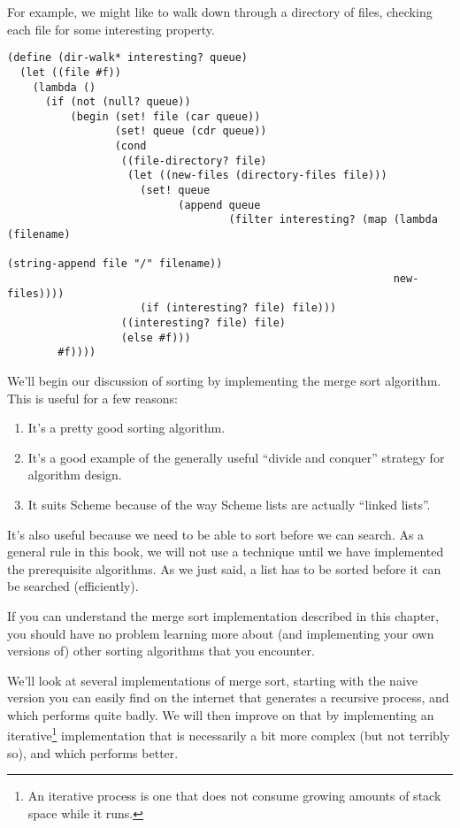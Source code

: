 \documentclass[12pt,openright,draft]{book}
\begin{document}
For example, we might like to walk down through a directory of files,
checking each file for some interesting property.

\begin{verbatim}
(define (dir-walk* interesting? queue)
  (let ((file #f))
    (lambda ()
      (if (not (null? queue))
          (begin (set! file (car queue))
                 (set! queue (cdr queue))
                 (cond
                  ((file-directory? file)
                   (let ((new-files (directory-files file)))
                     (set! queue
                           (append queue
                                   (filter interesting? (map (lambda (filename)
                                                               (string-append file "/" filename))
                                                             new-files))))
                     (if (interesting? file) file)))
                  ((interesting? file) file)
                  (else #f)))
        #f))))
\end{verbatim}

We'll begin our discussion of sorting by implementing the merge sort
algorithm.  This is useful for a few reasons:

\begin{enumerate}
\item It's a pretty good sorting algorithm.
\item It's a good example of the generally useful ``divide and
  conquer'' strategy for algorithm design.
\item It suits Scheme because of the way Scheme lists are
  actually ``linked lists''.
\end{enumerate}

It's also useful because we need to be able to sort before we can
search.  As a general rule in this book, we will not use a technique
until we have implemented the prerequisite algorithms.  As we just
said, a list has to be sorted before it can be searched (efficiently).

If you can understand the merge sort implementation described in this
chapter, you should have no problem learning more about (and
implementing your own versions of) other sorting algorithms that you
encounter.

We'll look at several implementations of merge sort, starting with the
naive version you can easily find on the internet that generates a
recursive process, and which performs quite badly.  We will then
improve on that by implementing an iterative\footnote{An iterative
  process is one that does not consume growing amounts of stack space
  while it runs.} implementation that is necessarily a bit more
complex (but not terribly so), and which performs better.
\end{document}
